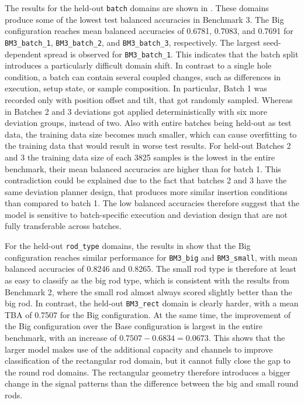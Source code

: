 The results for the held-out \texttt{batch} domains are shown in . These domains produce some of the lowest test balanced accuracies in Benchmark 3. The Big configuration reaches mean balanced accuracies of 0.6781, 0.7083, and 0.7691 for \texttt{BM3\_batch\_1}, \texttt{BM3\_batch\_2}, and \texttt{BM3\_batch\_3}, respectively. The largest seed-dependent spread is observed for \texttt{BM3\_batch\_1}. This indicates that the batch split introduces a particularly difficult domain shift. In contrast to a single hole condition, a batch can contain several coupled changes, such as differences in execution, setup state, or sample composition. In particular, Batch 1 was recorded only with position offset and tilt, that got randomly sampled. Whereas in Batches 2 and 3 deviations got applied deterministically with six more deviation groups, instead of two. Also with entire batches being held-out as test data, the training data size becomes much smaller, which can cause overfitting to the training data that would result in worse test results. For held-out Batches 2 and 3 the training data size of each 3825 samples is the lowest in the entire benchmark, their mean balanced accuracies are higher than for batch 1. This contradiction could be explained due to the fact that batches 2 and 3 have the same deviation planner design, that produces more similar insertion conditions than compared to batch 1. The low balanced accuracies therefore suggest that the model is sensitive to batch-specific execution and deviation design that are not fully transferable across batches.



For the held-out \texttt{rod\_type} domains, the results in  show that the Big configuration reaches similar performance for \texttt{BM3\_big} and \texttt{BM3\_small}, with mean balanced accuracies of 0.8246 and 0.8265. The small rod type is therefore at least as easy to classify as the big rod type, which is consistent with the results from Benchmark 2, where the small rod almost always scored slightly better than the big rod. In contrast, the held-out \texttt{BM3\_rect} domain is clearly harder, with a mean TBA of 0.7507 for the Big configuration. At the same time, the improvement of the Big configuration over the Base configuration is largest in the entire benchmark, with an increase of $0.7507 - 0.6834 = 0.0673$. This shows that the larger model makes use of the additional capacity and channels to improve classification of the rectangular rod domain, but it cannot fully close the gap to the round rod domains. The rectangular geometry therefore introduces a bigger change in the signal patterns than the difference between the big and small round rods.

